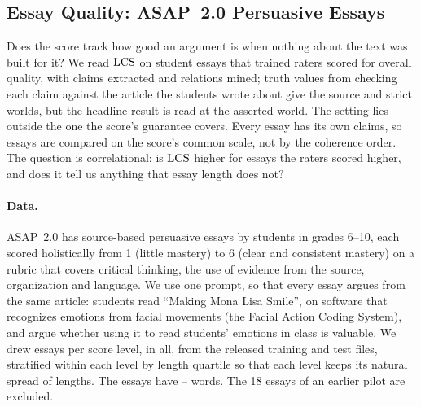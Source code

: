 
\subsection{Essay Quality: ASAP~2.0 Persuasive Essays}
\label{app:asap}

Does the score track how good an argument is when nothing about the text was built for it? We
read $\mathrm{LCS}$ on student essays that trained raters scored for overall quality, with claims extracted and relations mined; truth values from checking each claim against the article
the students wrote about give the source and strict worlds, but the headline result is read at the
asserted world. The setting lies outside
the one the score's guarantee covers. Every essay has its own claims, so essays are compared on
the score's common scale, not by the coherence order. The question is correlational: is $\mathrm{LCS}$
higher for essays the raters scored higher, and does it tell us anything that essay length does
not?

\paragraph{Data.} ASAP~2.0 \citep{crossley2025asap} has source-based persuasive essays by students
in grades 6--10, each scored holistically from 1 (little mastery) to 6 (clear and consistent
mastery) on a rubric that covers critical thinking, the use of evidence from the source,
organization and language. We use one prompt, so that every essay argues from the same article:
students read ``Making Mona Lisa Smile'', on software that recognizes emotions from facial
movements (the Facial Action Coding System), and argue whether using it to read students'
emotions in class is valuable. We drew \asapPerLevel{} essays per score level, \asapEssays{} in
all, from the released training and test files, stratified within each level by length quartile
so that each level keeps its natural spread of lengths. The essays have \asapWordsMin--\asapWordsMax{}
words. The 18 essays of an earlier pilot are excluded.

